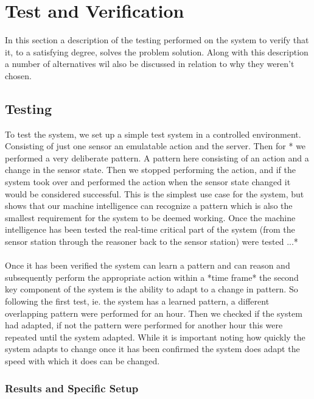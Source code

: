 \section{Test and Verification}
In this section a description of the testing performed on the system to verify that it, to a satisfying degree, solves the problem solution. Along with this description a number of alternatives wil also be discussed in relation to why they weren't chosen.

\subsection{Testing}
To test the system, we set up a simple test system in a controlled environment. Consisting of just one sensor an emulatable action and the server. Then for * we performed a very deliberate pattern. A pattern here consisting of an action and a change in the sensor state. Then we stopped performing the action, and if the system took over and performed the action when the sensor state changed it would be considered successful. This is the simplest use case for the system, but shows that our machine intelligence can recognize a pattern which is also the smallest requirement for the system to be deemed working. Once the machine intelligence has been tested the real-time critical part of the system (from the sensor station through the reasoner back to the sensor station) were tested ...*
\\\\
Once it has been verified the system can learn a pattern and can reason and subsequently perform the appropriate action within a *time frame* the second key component of the system is the ability to adapt to a change in pattern. So following the first test, ie. the system has a learned pattern, a different overlapping pattern were performed for an hour. Then we checked if the system had adapted, if not the pattern were performed for another hour this were repeated until the system adapted. While it is important noting how quickly the system adapts to change once it has been confirmed the system does adapt the speed with which it does can be changed.
\subsubsection{Results and Specific Setup}

